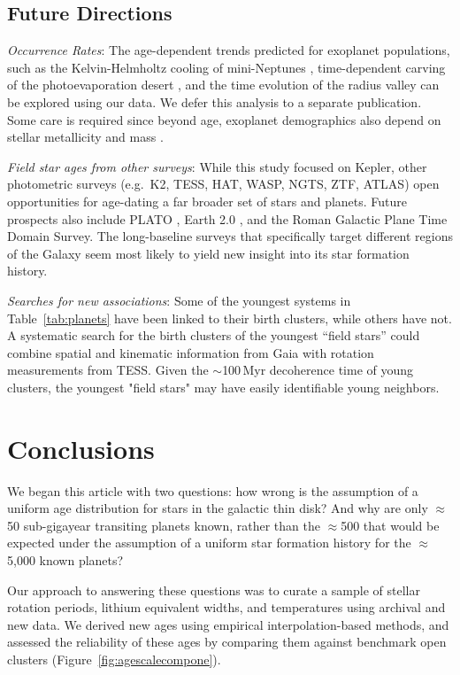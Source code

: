 \documentclass[11pt,twocolumn,tighten]{aastex63}
\begin{document}
\subsection{Future Directions}

{\it Occurrence Rates}:
The age-dependent trends predicted for exoplanet populations, such as
the Kelvin-Helmholtz cooling of mini-Neptunes \citep{Gupta_2019},
time-dependent carving of the photoevaporation desert
\citep{Owen_Lai_2018}, and the time evolution of the radius valley
\citep{Rogers_2021} can be explored using our data.  We defer this
analysis to a separate publication.
Some care is required since beyond age,
exoplanet demographics also depend on stellar metallicity and mass
\citep[e.g.][]{Petigura_2018,Miyazaki2023}.  

{\it Field star ages from other surveys}:
While this study focused on
Kepler, other photometric surveys (e.g.~K2, TESS, HAT, WASP, NGTS, ZTF,
ATLAS) open opportunities for age-dating a far broader set
of stars and planets.
Future prospects also include PLATO
\citep{Rauer14}, Earth 2.0 \citep{2022arXiv220606693G}, and the Roman
Galactic Plane Time Domain Survey.
The long-baseline surveys 
that specifically target different regions of the Galaxy
seem most likely to yield new insight into its star
formation history.

{\it Searches for new associations}:
Some of the youngest systems in Table~\ref{tab:planets} have been
linked to their birth clusters, while others have not. A systematic
search for the birth clusters of the youngest ``field stars'' could
combine spatial and kinematic information from Gaia with rotation
measurements from TESS. Given the $\sim$100\,Myr decoherence time of
young clusters, the youngest "field stars" may have easily
identifiable young neighbors.



\section{Conclusions}
\label{sec:conclusions}

We began this article with two questions: how wrong is the assumption
of a uniform age distribution for stars in the galactic thin disk?
And why are only $\approx$50 sub-gigayear transiting planets known,
rather than the $\approx$500 that would be expected under the
assumption of a uniform star formation history for the
$\approx$5{,}000 known planets?

Our approach to answering these questions was to curate a sample of
stellar rotation periods, lithium equivalent widths, and temperatures
using archival and new data.  We derived new ages using empirical
interpolation-based methods, and assessed the reliability of these ages
by comparing them against benchmark open clusters
(Figure~\ref{fig:agescalecompone}).
\end{document}
